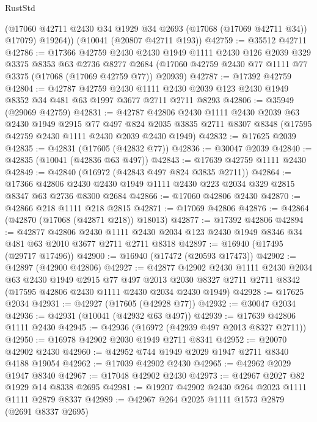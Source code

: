 \begin{lexlean}{RustStd}
\begin{coremodule}
        (@17060 @42711 @2430 @34 @1929 @34 @2693 (@17068 (@17069 @42711 @34)) @17079)
        @19264))
    (@10041 (@20807 @42711 @193))
@42759 := @35512 @42711
@42786 := @17366
    @42759
    @2430
    @2430
    @1949
    @1111
    @2430
    @126
    @2039
    @329
    @3375
    @8353
    @63
    @2736
    @8277
    @2684
    (@17060 @42759 @2430 @77 @1111 @77 @3375 (@17068 (@17069 @42759 @77)) @20939)
@42787 := @17392 @42759
@42804 := @42787
    @42759
    @2430
    @1111
    @2430
    @2039
    @123
    @2430
    @1949
    @8352
    @34
    @481
    @63
    @1997
    @3677
    @2711
    @2711
    @8293
@42806 := @35949 (@29069 @42759)
@42831 := @42787
    @42806
    @2430
    @1111
    @2430
    @2039
    @63
    @2430
    @1949
    @2915
    @77
    @497
    @824
    @2035
    @3835
    @2711
    @8307
    @8348
    (@17595 @42759 @2430 @1111 @2430 @2039 @2430 @1949)
@42832 := @17625 @2039
@42835 := @42831 (@17605 (@42832 @77))
@42836 := @30047 @2039
@42840 := @42835 (@10041 (@42836 @63 @497))
@42843 := @17639 @42759 @1111 @2430
@42849 := @42840 (@16972 (@42843 @497 @824 @3835 @2711))
@42864 := @17366
    @42806
    @2430
    @2430
    @1949
    @1111
    @2430
    @223
    @2034
    @329
    @2815
    @8347
    @63
    @2736
    @8300
    @2684
@42866 := @17060 @42806 @2430
@42870 := @42866 @218 @1111 @218 @2815
@42871 := @17069 @42806
@42876 := @42864 (@42870 (@17068 (@42871 @218)) @18013)
@42877 := @17392 @42806
@42894 := @42877
    @42806
    @2430
    @1111
    @2430
    @2034
    @123
    @2430
    @1949
    @8346
    @34
    @481
    @63
    @2010
    @3677
    @2711
    @2711
    @8318
@42897 := @16940 (@17495 (@29717 @17496))
@42900 := @16940 (@17472 (@20593 @17473))
@42902 := @42897 (@42900 @42806)
@42927 := @42877
    @42902
    @2430
    @1111
    @2430
    @2034
    @63
    @2430
    @1949
    @2915
    @77
    @497
    @2013
    @2030
    @8327
    @2711
    @2711
    @8342
    (@17595 @42806 @2430 @1111 @2430 @2034 @2430 @1949)
@42928 := @17625 @2034
@42931 := @42927 (@17605 (@42928 @77))
@42932 := @30047 @2034
@42936 := @42931 (@10041 (@42932 @63 @497))
@42939 := @17639 @42806 @1111 @2430
@42945 := @42936 (@16972 (@42939 @497 @2013 @8327 @2711))
@42950 := @16978 @42902 @2030 @1949 @2711 @8341
@42952 := @20070 @42902 @2430
@42960 := @42952 @744 @1949 @2029 @1947 @2711 @8340 @4188 @19054
@42962 := @17039 @42902 @2430
@42965 := @42962 @2029 @1947 @8340
@42967 := @17048 @42902 @2430
@42973 := @42967 @2027 @82 @1929 @14 @8338 @2695
@42981 := @19207 @42902 @2430 @264 @2023 @1111 @1111 @2879 @8337
@42989 := @42967 @264 @2025 @1111 @1573 @2879 (@2691 @8337 @2695)

\end{coremodule}
\end{lexlean}
